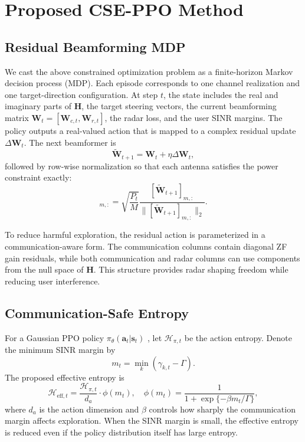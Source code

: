 \documentclass[10pt,journal]{IEEEtran}
\newcommand{\vect}[1]{\mathbf{#1}}
\newcommand{\mat}[1]{\mathbf{#1}}
\begin{document}
\section{Proposed CSE-PPO Method}
\subsection{Residual Beamforming MDP}
We cast the above constrained optimization problem as a finite-horizon
Markov decision process (MDP). Each episode corresponds to one channel
realization and one target-direction configuration. At step $t$, the
state includes the real and imaginary parts of $\mat{H}$, the target
steering vectors, the current beamforming matrix
$\mat{W}_t=[\mat{W}_{c,t},\mat{W}_{r,t}]$, the radar loss, and the user
SINR margins. The policy outputs a real-valued action that is mapped to a
complex residual update $\Delta\mat{W}_t$. The next beamformer is
\begin{equation}
    \widetilde{\mat{W}}_{t+1}=\mat{W}_t+\eta\Delta\mat{W}_t,
\end{equation}
followed by row-wise normalization so that each antenna satisfies the
power constraint exactly:
\begin{equation}
    [\mat{W}_{t+1}]_{m,:}
    =
    \sqrt{\frac{P_t}{M}}
    \frac{[\widetilde{\mat{W}}_{t+1}]_{m,:}}
    {\|[\widetilde{\mat{W}}_{t+1}]_{m,:}\|_2}.
\end{equation}

To reduce harmful exploration, the residual action is parameterized in a
communication-aware form. The communication columns contain diagonal ZF
gain residuals, while both communication and radar columns can use
components from the null space of $\mat{H}$. This structure provides
radar shaping freedom while reducing user interference.

\subsection{Communication-Safe Entropy}
For a Gaussian PPO policy $\pi_\theta(\vect{a}_t|\vect{s}_t)$ \cite{schulman2017ppo}, let
$\mathcal{H}_{\pi,t}$ be the action entropy. Denote the minimum SINR
margin by
\begin{equation}
    m_t=\min_k(\gamma_{k,t}-\Gamma).
\end{equation}
The proposed effective entropy is
\begin{equation}
    \mathcal{H}_{\mathrm{eff},t}
    =
    \frac{\mathcal{H}_{\pi,t}}{d_a}
    \cdot
    \phi(m_t),
    \quad
    \phi(m_t)=
    \frac{1}{1+\exp\{-\beta m_t/\Gamma\}},
\end{equation}
where $d_a$ is the action dimension and $\beta$ controls how sharply the
communication margin affects exploration. When the SINR margin is small,
the effective entropy is reduced even if the policy distribution itself
has large entropy.
\end{document}
